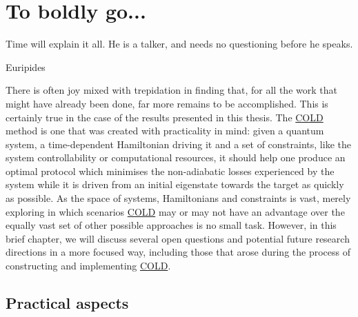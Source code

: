 \documentclass[a4paper,oneside,11pt]{book}
\newcommand{\acrref}[1]{\hyperref[acr:#1]{#1}}
\begin{document}
\chapter{To boldly go...}\label{chap:9_Future_directions}

\epigraph{Time will explain it all. He is a talker, and needs no questioning before he speaks.}{Euripides}

There is often joy mixed with trepidation in finding that, for all the work that might have already been done, far more remains to be accomplished. This is certainly true in the case of the results presented in this thesis. The \acrref{COLD} method is one that was created with practicality in mind: given a quantum system, a time-dependent Hamiltonian driving it and a set of constraints, like the system controllability or computational resources, it should help one produce an optimal protocol which minimises the non-adiabatic losses experienced by the system while it is driven from an initial eigenstate towards the target as quickly as possible. As the space of systems, Hamiltonians and constraints is vast, merely exploring in which scenarios \acrref{COLD} may or may not have an advantage over the equally vast set of other possible approaches is no small task. However, in this brief chapter, we will discuss several open questions and potential future research directions in a more focused way, including those that arose during the process of constructing and implementing \acrref{COLD}. 

\section{Practical aspects}
\end{document}
